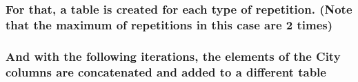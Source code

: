 \documentclass[11pt]{article}
\begin{document}
\hypertarget{for-that-a-table-is-created-for-each-type-of-repetition.-note-that-the-maximum-of-repetitions-in-this-case-are-2-times}{%
\subsubsection{For that, a table is created for each type of repetition.
(Note that the maximum of repetitions in this case are 2
times)}\label{for-that-a-table-is-created-for-each-type-of-repetition.-note-that-the-maximum-of-repetitions-in-this-case-are-2-times}}

\hypertarget{and-with-the-following-iterations-the-elements-of-the-city-columns-are-concatenated-and-added-to-a-different-table}{%
\subsubsection{And with the following iterations, the elements of the
City columns are concatenated and added to a different
table}\label{and-with-the-following-iterations-the-elements-of-the-city-columns-are-concatenated-and-added-to-a-different-table}}
\end{document}
